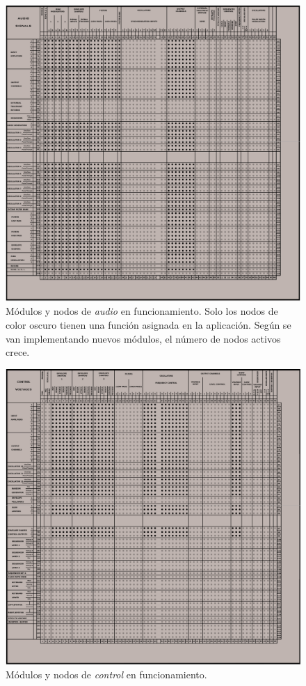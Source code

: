 \begin{figure}[H]
	\centering
	\includegraphics[width=1\textwidth]{nodos_enabled_audio}
	\caption[Módulos y nodos de \textit{audio} en funcionamiento]{Módulos y nodos de \textit{audio} en funcionamiento. Solo los nodos de color oscuro tienen una función asignada en la aplicación. Según se van implementando nuevos módulos, el número de nodos activos crece.}
	\label{fig:nodos_enabled_audio}
\end{figure}

\begin{figure} [H]
	\centering
	\includegraphics[width=1\textwidth]{nodos_enabled_control}
	\caption[Módulos y nodos de \textit{control} en funcionamiento]{Módulos y nodos de \textit{control} en funcionamiento.}
	\label{fig:nodos_enabled_control}
\end{figure}

